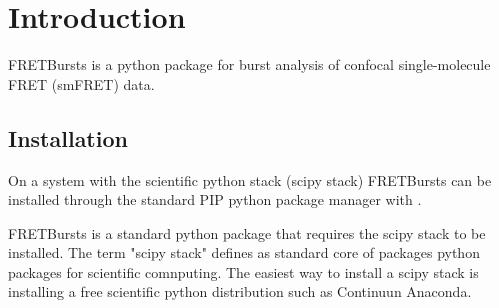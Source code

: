 \section{Introduction}

FRETBursts is a python package for burst analysis of confocal single-molecule FRET (smFRET) data.

\subsection{Installation}

On a system with the scientific python stack (scipy stack) FRETBursts can be installed through the standard PIP python package manager with . 

FRETBursts is a standard python package that requires the scipy stack to be installed.
The term "scipy stack" defines as standard core of packages python packages for scientific comnputing.  The easiest way to install a scipy stack is installing a free scientific python distribution such as Continuun Anaconda.


